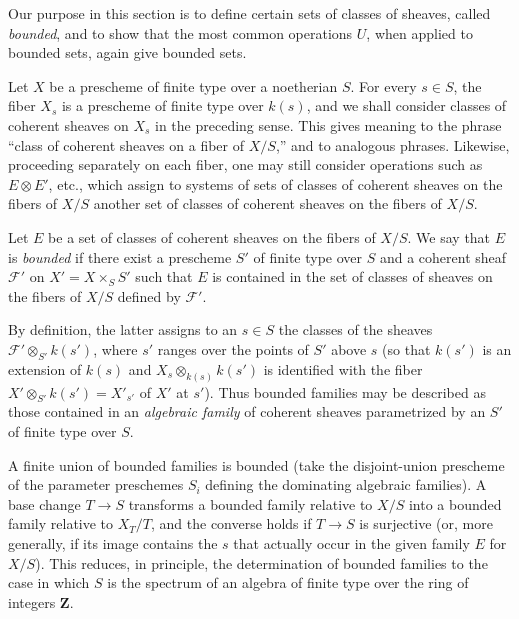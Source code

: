 Our purpose in this section is to define certain sets of classes of sheaves,
called \emph{bounded}, and to show that the most common operations $U$, when
applied to bounded sets, again give bounded sets.

Let $X$ be a prescheme of finite type over a noetherian $S$. For every
$s\in S$, the fiber $X_s$ is a prescheme of finite type over $k(s)$, and we
shall consider classes of coherent sheaves on $X_s$ in the preceding sense.
This gives meaning to the phrase “class of coherent sheaves on a fiber of
$X/S$,” and to analogous phrases. Likewise, proceeding separately on each
fiber, one may still consider operations such as $E\otimes E'$, etc., which
assign to systems of sets of
classes of coherent sheaves on the fibers of $X/S$ another set of classes of
coherent sheaves on the fibers of $X/S$.

 Let $E$ be a set of classes of coherent sheaves on the
fibers of $X/S$. We say that $E$ is \emph{bounded} if there exist a prescheme
$S'$ of finite type over $S$ and a coherent sheaf $\mathcal F'$ on
$X'=X\times_S S'$ such that $E$ is contained in the set of classes of sheaves
on the fibers of $X/S$ defined by $\mathcal F'$.

By definition, the latter assigns to an $s\in S$ the classes of the sheaves
$\mathcal F'\otimes_{S'}k(s')$, where $s'$ ranges over the points of $S'$ above
$s$ (so that $k(s')$ is an extension of $k(s)$ and
$X_s\otimes_{k(s)}k(s')$ is identified with the fiber
$X'\otimes_{S'}k(s')=X'_{s'}$ of $X'$ at $s'$). Thus bounded families may be
described as those contained in an \emph{algebraic family} of coherent sheaves
parametrized by an $S'$ of finite type over $S$.

A finite union of bounded families is bounded (take the disjoint-union
prescheme of the parameter preschemes $S_i$ defining the dominating algebraic
families). A base change $T\longrightarrow S$ transforms a bounded family
relative to $X/S$ into a bounded family relative to $X_T/T$, and the converse
holds if $T\longrightarrow S$ is surjective (or, more generally, if its image
contains the $s$ that actually occur in the given family $E$ for $X/S$). This
reduces, in principle, the determination of bounded families to the case in
which $S$ is the spectrum of an algebra of finite type over the ring of
integers $\mathbf Z$.

